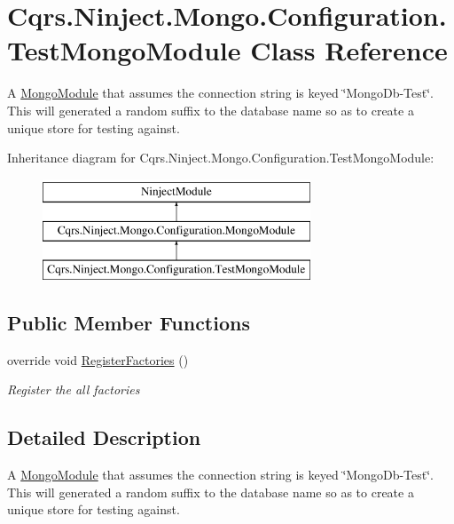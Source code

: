 \hypertarget{classCqrs_1_1Ninject_1_1Mongo_1_1Configuration_1_1TestMongoModule}{}\section{Cqrs.\+Ninject.\+Mongo.\+Configuration.\+Test\+Mongo\+Module Class Reference}
\label{classCqrs_1_1Ninject_1_1Mongo_1_1Configuration_1_1TestMongoModule}


A \hyperlink{classCqrs_1_1Ninject_1_1Mongo_1_1Configuration_1_1MongoModule}{Mongo\+Module} that assumes the connection string is keyed \char`\"{}\+Mongo\+Db-\/\+Test\char`\"{}. This will generated a random suffix to the database name so as to create a unique store for testing against.  


Inheritance diagram for Cqrs.\+Ninject.\+Mongo.\+Configuration.\+Test\+Mongo\+Module\+:\begin{figure}[H]
\begin{center}
\leavevmode
\includegraphics[height=3.000000cm]{classCqrs_1_1Ninject_1_1Mongo_1_1Configuration_1_1TestMongoModule}
\end{center}
\end{figure}
\subsection*{Public Member Functions}
\begin{DoxyCompactItemize}
\item 
override void \hyperlink{classCqrs_1_1Ninject_1_1Mongo_1_1Configuration_1_1TestMongoModule_a8cce844ec177b88a0be2ca8f71b2bc6b_a8cce844ec177b88a0be2ca8f71b2bc6b}{Register\+Factories} ()
\begin{DoxyCompactList}\small\item\em Register the all factories \end{DoxyCompactList}\end{DoxyCompactItemize}


\subsection{Detailed Description}
A \hyperlink{classCqrs_1_1Ninject_1_1Mongo_1_1Configuration_1_1MongoModule}{Mongo\+Module} that assumes the connection string is keyed \char`\"{}\+Mongo\+Db-\/\+Test\char`\"{}. This will generated a random suffix to the database name so as to create a unique store for testing against. 




